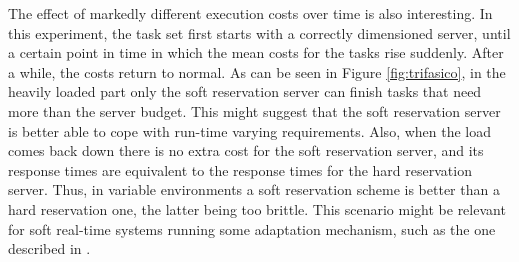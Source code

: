 \documentclass[times, 10pt,twocolumn]{article}
\begin{document}
The effect of markedly different execution costs over time is also
interesting. In this experiment, the task set first starts with a
correctly dimensioned server, until a certain point in time in which
the mean costs for the tasks rise suddenly. After a while, the costs
return to normal. As can be seen in Figure \ref{fig:trifasico}, in the
heavily loaded part only the soft reservation server can finish tasks
that need more than the server budget. This might suggest that the
soft reservation server is better able to cope with run-time varying
requirements. Also, when the load comes back down there is no extra
cost for the soft reservation server, and its response times are
equivalent to the response times for the hard reservation
server. Thus, in variable environments a soft reservation scheme is
better than a hard reservation one, the latter being too brittle. This
scenario might be relevant for soft real-time systems running some
adaptation mechanism, such as the one described in
\cite{abeni.ea05:qos}.
\end{document}
